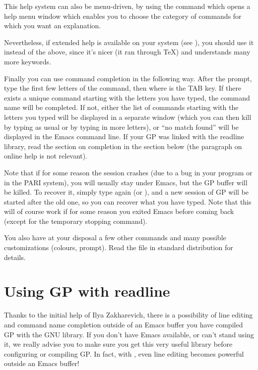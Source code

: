   This help system can also be menu-driven, by using the command
 which opens a help menu window which enables you to choose
the category of commands for which you want an explanation.

  Nevertheless, if extended help is available on your system (see
), you should use it instead of the above, since it's
nicer (it ran through \TeX) and understands many more keywords.

  Finally you can use command completion in the following way. After the
prompt, type the first few letters of the command, then  where
 is the TAB key. If there exists a unique command starting with
the letters you have typed, the command name will be completed. If not,
either the list of commands starting with the letters you typed will be
displayed in a separate window (which you can then kill by typing as usual
 or by typing in more letters), or ``no match found'' will be
displayed in the Emacs command line. If your GP was linked with the readline
library, read the section on completion in the section below (the paragraph
on online help is not relevant).

Note that if for some reason the session crashes (due to a bug in your
program or in the PARI system), you will usually stay under Emacs, but the GP
buffer will be killed. To recover it, simply type again  (or
), and a new session of GP will be started after the old one,
so you can recover what you have typed. Note that this will of course
 work if for some reason you exited Emacs before coming back (except
for the  temporary stopping command).

\smallskip
You also have at your disposal a few other commands and many possible
customizations (colours, prompt). Read the file  in
standard distribution for details.


\section{Using GP with readline}

  Thanks to the initial help of Ilya Zakharevich, there is a possibility of
line editing and command name completion outside of an Emacs buffer
 you have compiled GP with the GNU  library. If you
don't have Emacs available, or can't stand using it, we really advise you
to make sure you get this very useful library before configuring or
compiling GP. In fact, with , even line editing becomes
 powerful outside an Emacs buffer!

